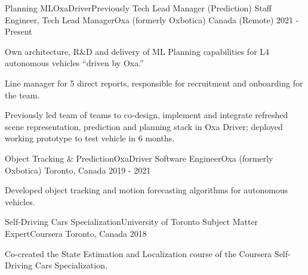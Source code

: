 

\begin{cventries}

  \cventry
    {Planning ML{\awesomesep}OxaDriver{\awesomesep}Previously Tech Lead Manager (Prediction)} %
    {Staff Engineer, Tech Lead Manager{\awesomesep}Oxa (formerly Oxbotica)} %
    {Canada (Remote)} %
    {2021 - Present} %
    {
      \begin{cvitems} %
        \item {Own architecture, R\&D and delivery of ML Planning capabilities for L4 autonomous vehicles ``driven by Oxa.''}
        \item {Line manager for 5 direct reports, responsible for recruitment and onboarding for the team.}
        \item {Previously led team of teams to co-design, implement and integrate refreshed scene representation, prediction and planning stack in Oxa Driver; deployed working prototype to test vehicle in 6 months.}      
      \end{cvitems}
    }

  \cventry
    {Object Tracking \& Prediction{\awesomesep}OxaDriver} %
    {Software Engineer{\awesomesep}Oxa (formerly Oxbotica)} %
    {Toronto, Canada} %
    {2019 - 2021} %
    {
      \begin{cvitems} %
        \item {Developed object tracking and motion forecasting algorithms for autonomous vehicles.}
      \end{cvitems}
    }
  
  \cventry
    {Self-Driving Cars Specialization{\awesomesep}University of Toronto} %
    {Subject Matter Expert{\awesomesep}Coursera} %
    {Toronto, Canada} %
    {2018} %
    {
      \begin{cvitems} %
        \item {Co-created the State Estimation and Localization course of the Coursera Self-Driving Cars Specialization.}
      \end{cvitems}
    }
  

\end{cventries}
